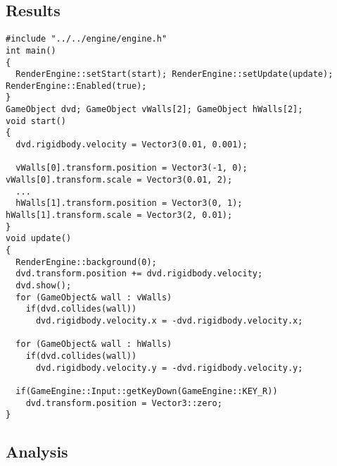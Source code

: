 


\subsection*{Results}

\begin{lstlisting}[caption={DVD\_Logo\_Bouncer Example Code}]
#include "../../engine/engine.h"  
int main()
{
  RenderEngine::setStart(start); RenderEngine::setUpdate(update); RenderEngine::Enabled(true);
}
GameObject dvd; GameObject vWalls[2]; GameObject hWalls[2];
void start()
{
  dvd.rigidbody.velocity = Vector3(0.01, 0.001);

  vWalls[0].transform.position = Vector3(-1, 0); vWalls[0].transform.scale = Vector3(0.01, 2);
  ...
  hWalls[1].transform.position = Vector3(0, 1); hWalls[1].transform.scale = Vector3(2, 0.01);
}
void update()
{
  RenderEngine::background(0);
  dvd.transform.position += dvd.rigidbody.velocity;
  dvd.show();
  for (GameObject& wall : vWalls)
    if(dvd.collides(wall)) 
      dvd.rigidbody.velocity.x = -dvd.rigidbody.velocity.x;

  for (GameObject& wall : hWalls)
    if(dvd.collides(wall)) 
      dvd.rigidbody.velocity.y = -dvd.rigidbody.velocity.y;

  if(GameEngine::Input::getKeyDown(GameEngine::KEY_R))
    dvd.transform.position = Vector3::zero;
}
\end{lstlisting}

\subsection*{Analysis}

